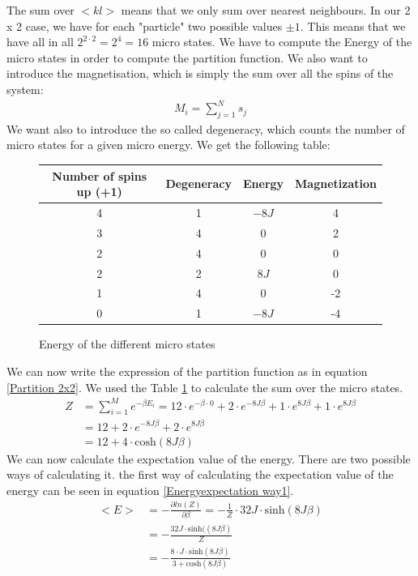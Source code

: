 \documentclass[10pt,a4paper]{article}
\begin{document}
The sum over $<kl>$ means that we only sum over nearest neighbours. In our 2 x 2 case, we have for each "particle" two possible values $\pm 1$. This means that we have all in all $2^{2 \cdot 2} = 2^4=16$ micro states. We have to compute the Energy of the micro states in order to compute the partition function. 
We also want to introduce the magnetisation, which is simply the sum over all the spins of the system:
\begin{align}
M_i=\sum_{j=1}^N s_j
\end{align}
We want also to introduce the so called degeneracy, which counts the number of micro states for a given micro energy. We get the following table:
\begin{figure}[h]
\centering
\caption{Energy of the different micro states}
\label{table of microstates}
\begin{tabular}{c|c|c|c}
Number of spins up (+1) & Degeneracy &  Energy & Magnetization\\
\hline \hline
4 & 1 & $-8J$ & 4 \\
3 & 4 & 0 & 2 \\
2 & 4 & 0 & 0 \\
2 & 2 & $8J$ & 0 \\
1 & 4 & 0 & -2 \\
0 & 1 & $-8J$ & -4 
\end{tabular}
\end{figure}
We can now write the expression of the partition function as in equation \ref{Partition 2x2}. We used the Table \ref{table of microstates} to calculate the sum over the micro states. 
\begin{align}
Z&= \sum_{i=1}^{M} e^{- \beta E_i}= 12 \cdot e^{-\beta \cdot 0 } + 2 \cdot e^{-8J \beta } + 1 \cdot e^{8J \beta } + 1 \cdot e^{8J \beta } \\
&= 12+ 2 \cdot e^{-8J \beta } + 2 \cdot e^{8J \beta } \\
&= 12+ 4 \cdot \mathrm{cosh} \left( 8J \beta \right) \label{Partition 2x2}
\end{align} 
We can now calculate the expectation value of the energy. There are two possible ways of calculating it. the first way of calculating the expectation value of the energy can be seen in equation \ref{Energyexpectation way1}. 
\begin{align}
<E>&= - \frac{\partial ln(Z)}{\partial \beta} =-\frac{1}{Z} \cdot 32J  \cdot \mathrm{sinh}(8J \beta ) \\ \label{Energyexpectation way1}
&= -\frac{32 J \cdot \mathrm{sinh}((8J \beta )}{Z}\\
&=-\frac{8 \cdot J \cdot  \mathrm{sinh}(8J \beta ) }{3+\mathrm{cosh}(8J\beta)}
\end{align}
\end{document}

